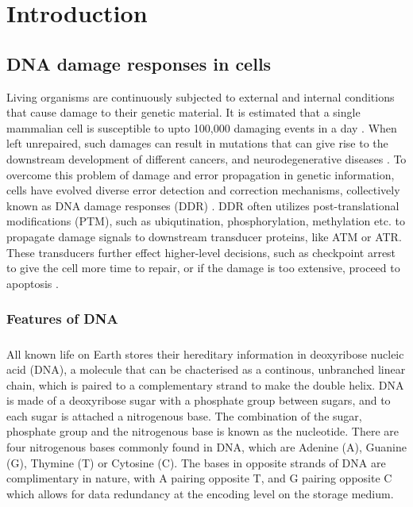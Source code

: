 \chapter{Introduction}
\section{DNA damage responses in cells}
Living organisms are continuously subjected to external and internal conditions that cause damage to their genetic material. It is estimated that a single mammalian cell is susceptible to upto 100,000 damaging events in a day \cite{ciccia2010dna}. When left unrepaired, such damages can result in mutations that can give rise to the downstream development of different cancers, and neurodegenerative diseases \cite{friedberg2005dna}. To overcome this problem of damage and error propagation in genetic information, cells have evolved diverse error detection and correction mechanisms, collectively known as DNA damage responses (DDR) \cite{hoeijmakers2009dna}. DDR often utilizes post-translational modifications (PTM), such as ubiqutination, phosphorylation, methylation etc. to propagate damage signals to downstream transducer proteins, like ATM or ATR. These transducers further effect higher-level decisions, such as checkpoint arrest to give the cell more time to repair, or if the damage is too extensive, proceed to apoptosis \cite{derks2014dna}.

\subsection{Features of DNA}
\paragraph*{} All known life on Earth stores their hereditary information in deoxyribose nucleic acid (DNA), a molecule that can be chacterised as a continous, unbranched linear chain, which is paired to a complementary strand to make the double helix. DNA is made of a deoxyribose sugar with a phosphate group between sugars, and to each sugar is attached a nitrogenous base. The combination of the sugar, phosphate group and the nitrogenous base is known as the nucleotide. There are four nitrogenous bases commonly found in DNA, which are Adenine (A), Guanine (G), Thymine (T) or Cytosine (C). The bases in opposite strands of DNA are complimentary in nature, with A pairing opposite T, and G pairing opposite C which allows for data redundancy at the encoding level on the storage medium.

